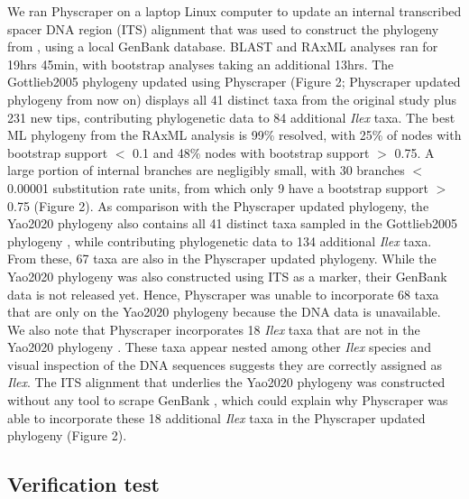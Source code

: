 \documentclass{bmcart}
\begin{document}
We ran Physcraper on a laptop Linux computer to update an internal transcribed
spacer DNA region (ITS) alignment that was used to construct the phylogeny from \cite{gottlieb2005molecular},
using a local GenBank database.  BLAST and RAxML analyses ran for 19hrs 45min, with bootstrap
analyses taking an additional 13hrs.
The Gottlieb2005 phylogeny \cite{gottlieb2005molecular} updated using Physcraper (Figure 2;
Physcraper updated phylogeny from now on) displays all 41 distinct
taxa from the original study plus 231 new tips, contributing phylogenetic data to
84 additional \textit{Ilex} taxa. The best ML phylogeny from the RAxML analysis is 99\%
resolved, with 25\% of nodes with bootstrap support $<$ 0.1 and 48\% nodes with
bootstrap support $>$ 0.75.
A large portion of internal branches are negligibly small, with 30 branches
$<$ 0.00001 substitution rate units, from which only 9 have a bootstrap support $>$ 0.75
(Figure 2).
As comparison with the Physcraper updated phylogeny, the Yao2020 phylogeny \cite{yao2020phylogeny}
also contains all 41 distinct taxa
sampled in the Gottlieb2005 phylogeny \cite{gottlieb2005molecular},
while contributing phylogenetic data to 134 additional \textit{Ilex} taxa. From these,
67 taxa are also in the Physcraper updated phylogeny.
While the Yao2020 phylogeny \cite{yao2020phylogeny} was also constructed using
ITS as a marker, their GenBank data is not released yet. Hence, Physcraper was unable
to incorporate 68 taxa that are only on the Yao2020 phylogeny because the DNA data is unavailable.
We also note that Physcraper incorporates 18 \textit{Ilex} taxa that are not in the Yao2020
phylogeny \cite{yao2020phylogeny}. These taxa appear nested among other \textit{Ilex} species
and visual inspection of the DNA sequences suggests they are correctly assigned as \textit{Ilex}.
The ITS alignment that underlies the Yao2020 phylogeny was constructed without any tool to
scrape GenBank \cite{yao2020phylogeny}, which could explain why Physcraper was able to
incorporate these 18 additional \textit{Ilex} taxa in the Physcraper updated phylogeny (Figure 2).


\subsection*{Verification test}
\end{document}
